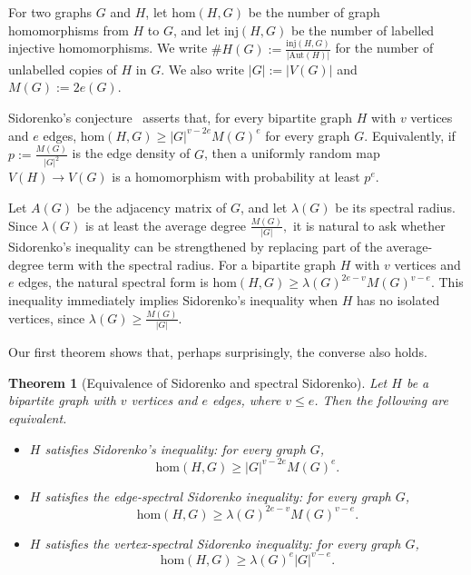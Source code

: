 \documentclass[11pt]{article}
\newtheorem{theorem}{Theorem}[section]
\theoremstyle{definition}
\theoremstyle{plain}
\newcommand{\inj}{\mathrm{inj}}
\newcommand{\homc}{\mathrm{hom}}
\newcommand{\Aut}{\mathrm{Aut}}
\begin{document}
For two graphs \(G\) and \(H\), let \(\homc(H,G)\) be the number of graph
homomorphisms from \(H\) to \(G\), and let \(\inj(H,G)\) be the number of
labelled injective homomorphisms.  We write  $\texttt{\#}H(G):=\frac{\inj(H,G)}{|\Aut(H)|}$
for the number of unlabelled copies of \(H\) in \(G\).  We also write $|G|:=|V(G)|$ and $M(G):=2e(G).$

Sidorenko's conjecture~\cite{Sidorenko1993CorrelationInequality}
asserts that, for every bipartite graph \(H\) with \(v\) vertices and
\(e\) edges,
$        \homc(H,G)\ge |G|^{v-2e} M(G)^e $
for every graph \(G\).  Equivalently, if
        $p:=\frac{M(G)}{|G|^2}$ is the edge density of \(G\), then a uniformly random map
\(V(H)\to V(G)\) is a homomorphism with probability at least \(p^e\).

Let \(A(G)\) be the adjacency matrix of \(G\), and let \(\lambda(G)\) be
its spectral radius.  Since
        $\lambda(G)$ is at least the average degree  $\frac{M(G)}{|G|},$
it is natural to ask whether Sidorenko's inequality can be strengthened
by replacing part of the average-degree term with  the spectral radius.  For
a bipartite graph \(H\) with \(v\) vertices and \(e\) edges, the natural
spectral form is
       $ \homc(H,G)\ge \lambda(G)^{2e-v}M(G)^{v-e}.$
This inequality immediately implies Sidorenko's
inequality when $H$ has no isolated vertices, since $\lambda(G)\ge \frac{M(G)}{|G|}$.

Our first theorem shows that, perhaps surprisingly, the converse also holds.

\begin{theorem}[Equivalence of Sidorenko and spectral Sidorenko]
\label{thm:equivalence}
Let \(H\) be a bipartite graph with \(v\) vertices and \(e\) edges, where
\(v\le e\).  Then the following are equivalent.
\begin{itemize}
    \item[\rm(i)]
    \(H\) satisfies Sidorenko's inequality: for every graph \(G\), 
    $$\homc(H,G)\ge |G|^{v-2e}M(G)^e.$$

    \item[\rm(ii)]
    \(H\) satisfies the edge-spectral Sidorenko inequality: for every graph \(G\), 
    \begin{equation}
\label{eq:spectral-sidorenko-general}
        \homc(H,G)\ge \lambda(G)^{2e-v}M(G)^{v-e}.
\end{equation}

\item[\rm (iii)]
$H$ satisfies the vertex-spectral Sidorenko inequality: for every graph $G$, 
\[  \homc (H,G)\ge \lambda(G)^e |G|^{v-e}. \] 
\end{itemize}
\end{theorem}
\end{document}
